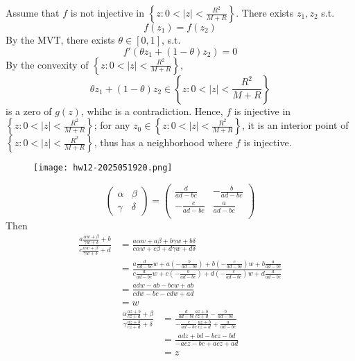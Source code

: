 Assume that $f$ is not injective in $\left\{  z:0<\lvert z \rvert<\frac{R^2}{M+R}  \right\}$. There exists $z_1,z_2$ s.t.
\[
f(z_1)=f(z_2)
\]
By the MVT, there exists $\theta\in[0,1]$, s.t.
\[
f'(\theta z_1+(1-\theta)z_2)=0
\]
By the convexity of $\left\{  z:0<\lvert z \rvert<\frac{R^2}{M+R}  \right\}$,
\[
\theta z_1+(1-\theta)z_2\in \left\{  z:0<\lvert z \rvert <\frac{R^2}{M+R}   \right\}
\]
is a zero of $g(z)$, whihc is a contradiction. Hence, $f$ is injective in $\left\{  z:0<\lvert z \rvert<\frac{R^2}{M+R}  \right\}$; for any $z_0\in \left\{  z:0<\lvert z \rvert<\frac{R^2}{M+R}  \right\}$, it is an interior point of $\left\{  z:0<\lvert z \rvert<\frac{R^2}{M+R}  \right\}$, thus has a neighborhood where $f$ is injective.

\begin{exercise}
\begin{figure}[H]
\centering
\texttt{[image: hw12-2025051920.png]}
\label{}
\end{figure}
\end{exercise}
\[
\begin{pmatrix}
\alpha & \beta \\
\gamma & \delta 
\end{pmatrix}=\left(
\begin{array}{cc}
 \frac{d}{a d-b c} & -\frac{b}{a d-b c} \\
 -\frac{c}{a d-b c} & \frac{a}{a d-b c} \\
\end{array}
\right)
\]
Then
\[
\begin{aligned}
\frac{a\frac{\alpha w+\beta}{\gamma w+\delta}+b}{c\frac{\alpha w+\beta}{\gamma w+\delta}+d} & =\frac{a\alpha w+a\beta+b\gamma w+b\delta}{c\alpha w+c\beta+d\gamma w+d\delta} \\
 & =\frac{a\frac{d}{a d-b c} w+a\left( -\frac{b}{a d-b c} \right)+b\left(  -\frac{c}{a d-b c} \right) w+b\frac{a}{a d-b c}}{c\frac{d}{a d-b c} w+c\left( -\frac{b}{a d-b c} \right)+d\left(  -\frac{c}{a d-b c} \right) w+d\frac{a}{a d-b c}} \\
 & =\frac{adw-ab-bcw+ab}{cdw-bc-cdw+ad} \\
 & =w
\end{aligned}
\]
\[
\begin{aligned}
\frac{\alpha\frac{az+b}{cz+d}+\beta}{\gamma\frac{az+b}{cz+d}+\delta} & =\frac{\frac{d}{a d-b c}\frac{az+b}{cz+d}-\frac{b}{a d-b c}}{-\frac{c}{a d-b c}\frac{az+b}{cz+d}+\frac{a}{a d-b c}} \\
 & =\frac{adz+bd-bcz-bd}{-acz-bc+acz+ad} \\
 & =z 
\end{aligned}
\]
